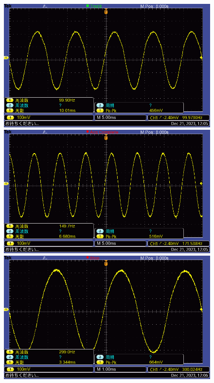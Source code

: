\documentclass{ltjsarticle}
\begin{document}
			\begin{figure}[H]
			\centering
			\begin{minipage}{0.4\columnwidth}
			\centering
			\includegraphics[width = \columnwidth]{figs/F0006TEK.PNG}
			\end{minipage}
			\hspace{0.04\columnwidth}
			\begin{minipage}{0.4\columnwidth}
			\centering
			\includegraphics[width = \columnwidth]{figs/F0007TEK.PNG}
			\end{minipage}
			\hspace{0.04\columnwidth}
			\begin{minipage}{0.4\columnwidth}
			\centering
			\includegraphics[width = \columnwidth]{figs/F0008TEK.PNG}

\end{minipage}
\end{figure}
\end{document}
